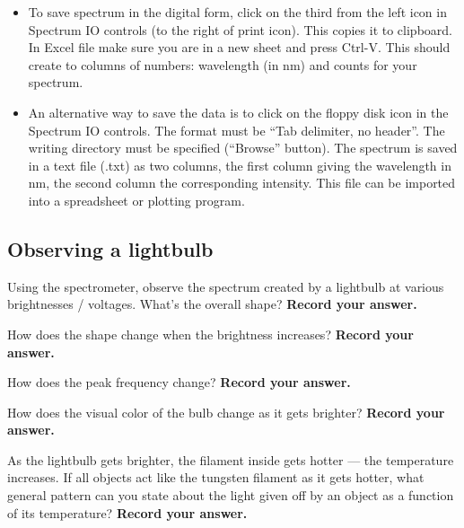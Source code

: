 \begin{itemize}
\begin{itemize}
	\item To save spectrum in the digital form, click on the third from the left icon in
	Spectrum IO controls (to the right of print icon). This copies it to clipboard. In
	Excel file make sure you are in a new sheet and press Ctrl-V. This should create
	to columns of numbers: wavelength (in nm) and counts for your spectrum.
	
	\item An alternative way to save the data is to click on the floppy disk icon in the
	Spectrum IO controls. The format must be ``Tab delimiter, no header''. The
	writing directory must be specified (``Browse'' button). The spectrum is saved in a
	text file (.txt) as two columns, the first column giving the wavelength in nm, the
	second column the corresponding intensity. This file can be imported into a spreadsheet or plotting program.
	\end{itemize}
\end{itemize}

\subsection{Observing a lightbulb}

\begin{steps}
	
	\item Using the spectrometer, observe the spectrum created by a lightbulb at various brightnesses / voltages.  What's the overall shape? \textbf{Record your answer.}
	
	\item How does the shape change when the brightness increases? \textbf{Record your answer.}
	
	\item How does the peak frequency change? \textbf{Record your answer.}
	
	\item How does the visual color of the bulb change as it gets brighter? \textbf{Record your answer.}
	
	\item\label{ic:step:pattern} As the lightbulb gets brighter, the filament inside gets hotter --- the temperature increases. If all objects act like the tungsten filament as it gets hotter, what general pattern can you state about the light given off by an object as a function of its temperature? \textbf{Record your answer.}

\end{steps}

